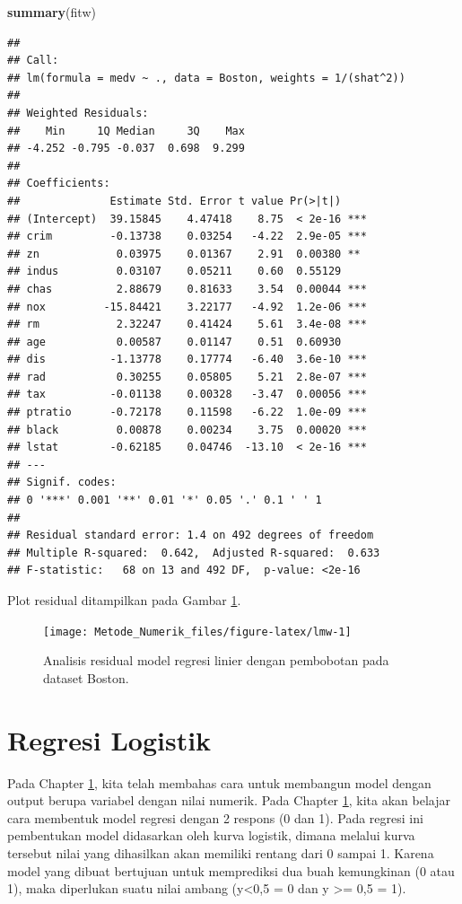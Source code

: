 \documentclass[]{book}
\newenvironment{Shaded}{\begin{snugshade}}{\end{snugshade}}
\newcommand{\KeywordTok}[1]{\textcolor[rgb]{0.13,0.29,0.53}{\textbf{#1}}}
\newcommand{\NormalTok}[1]{#1}
\theoremstyle{definition}
\theoremstyle{definition}
\theoremstyle{definition}
\theoremstyle{remark}
\begin{document}
\begin{Shaded}
\begin{Highlighting}[]
\KeywordTok{summary}\NormalTok{(fitw)}
\end{Highlighting}
\end{Shaded}

\begin{verbatim}
## 
## Call:
## lm(formula = medv ~ ., data = Boston, weights = 1/(shat^2))
## 
## Weighted Residuals:
##    Min     1Q Median     3Q    Max 
## -4.252 -0.795 -0.037  0.698  9.299 
## 
## Coefficients:
##              Estimate Std. Error t value Pr(>|t|)    
## (Intercept)  39.15845    4.47418    8.75  < 2e-16 ***
## crim         -0.13738    0.03254   -4.22  2.9e-05 ***
## zn            0.03975    0.01367    2.91  0.00380 ** 
## indus         0.03107    0.05211    0.60  0.55129    
## chas          2.88679    0.81633    3.54  0.00044 ***
## nox         -15.84421    3.22177   -4.92  1.2e-06 ***
## rm            2.32247    0.41424    5.61  3.4e-08 ***
## age           0.00587    0.01147    0.51  0.60930    
## dis          -1.13778    0.17774   -6.40  3.6e-10 ***
## rad           0.30255    0.05805    5.21  2.8e-07 ***
## tax          -0.01138    0.00328   -3.47  0.00056 ***
## ptratio      -0.72178    0.11598   -6.22  1.0e-09 ***
## black         0.00878    0.00234    3.75  0.00020 ***
## lstat        -0.62185    0.04746  -13.10  < 2e-16 ***
## ---
## Signif. codes:  
## 0 '***' 0.001 '**' 0.01 '*' 0.05 '.' 0.1 ' ' 1
## 
## Residual standard error: 1.4 on 492 degrees of freedom
## Multiple R-squared:  0.642,  Adjusted R-squared:  0.633 
## F-statistic:   68 on 13 and 492 DF,  p-value: <2e-16
\end{verbatim}

Plot residual ditampilkan pada Gambar \ref{fig:lmw}.

\begin{figure}

{\centering \texttt{[image: Metode\_Numerik\_files/figure-latex/lmw-1]} 

}

\caption{Analisis residual model regresi linier dengan pembobotan pada dataset Boston.}\label{fig:lmw}
\end{figure}

\hypertarget{logreg}{%
\section{Regresi Logistik}\label{logreg}}

Pada Chapter \ref{logreg}, kita telah membahas cara untuk membangun model dengan output berupa variabel dengan nilai numerik. Pada Chapter \ref{logreg}, kita akan belajar cara membentuk model regresi dengan 2 respons (0 dan 1). Pada regresi ini pembentukan model didasarkan oleh kurva logistik, dimana melalui kurva tersebut nilai yang dihasilkan akan memiliki rentang dari 0 sampai 1. Karena model yang dibuat bertujuan untuk memprediksi dua buah kemungkinan (0 atau 1), maka diperlukan suatu nilai ambang (y\textless{}0,5 = 0 dan y \textgreater{}= 0,5 = 1).
\end{document}
